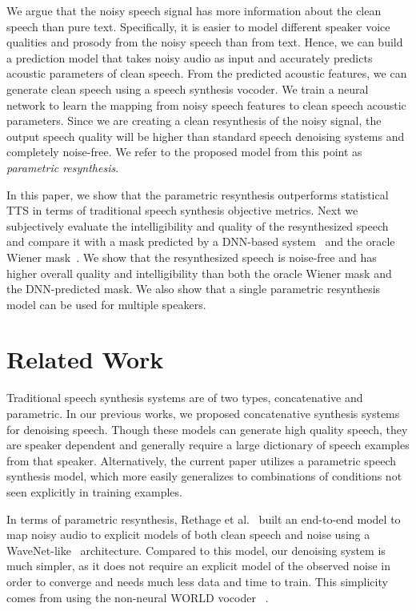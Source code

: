 \documentclass{article}
\begin{document}
We argue that the noisy speech signal has more information about the clean speech than pure text. Specifically, it is easier to model different speaker voice qualities and prosody from the noisy speech than from text. Hence, we can build a prediction model that takes noisy audio as input and accurately predicts acoustic parameters of clean speech. From the predicted acoustic features, we can generate clean speech using a speech synthesis vocoder. We train a neural network to learn the mapping from noisy speech features to clean speech acoustic parameters. Since we are creating a clean resynthesis of the noisy signal, the output speech quality will be higher than standard speech denoising systems and completely noise-free. We refer to the proposed model from this point as \emph{parametric resynthesis}.

In this paper, we show that the parametric resynthesis outperforms statistical TTS in terms of traditional speech synthesis objective metrics.  Next we subjectively evaluate the intelligibility and quality  of the resynthesized speech  and compare it with a mask predicted by a DNN-based system~\cite{WangTrainingTargetsSupervised2014} and the oracle Wiener mask~\cite{lim1979enhancement}. We show that the resynthesized speech is noise-free and has higher overall quality and intelligibility than both the oracle Wiener mask and the DNN-predicted mask. We also show that a single parametric resynthesis model can be used for multiple speakers.

\section{Related Work}
\label{sec:back}
Traditional speech synthesis systems are of two types, concatenative and parametric. In our previous works, \cite{mandel14c, maiti2017concatenative, maiti2018large, syed2018concatenative} we proposed concatenative synthesis systems for denoising speech. Though these models can generate high quality speech, they are speaker dependent and generally require a large dictionary of speech examples from that speaker. Alternatively, the current paper utilizes a parametric speech synthesis model, which more easily generalizes to combinations of conditions not seen explicitly in training examples.%

In terms of parametric resynthesis, Rethage et al.~\cite{rethage2018wavenet} built an end-to-end model to map noisy audio to explicit models of both clean speech and noise using a WaveNet-like~\cite{van2016wavenet} architecture.  Compared to this model, our denoising system is much simpler, as it does not require an explicit model of the observed noise in order to converge and needs much less data and time to train.  This simplicity comes from using the non-neural WORLD vocoder ~\cite{morise2016world}.
\end{document}
